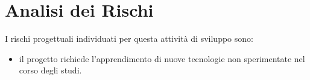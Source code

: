 \section*{Analisi dei Rischi}
I rischi progettuali individuati per questa attività di sviluppo sono:
\begin{itemize}
\item il progetto richiede l'apprendimento di nuove tecnologie non sperimentate nel corso degli studi. 
\end{itemize}